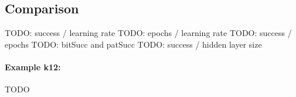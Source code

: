 

\subsection{Comparison} 

TODO: success / learning rate 
TODO: epochs / learning rate 
TODO: success / epochs 
TODO: bitSucc and patSucc
TODO: success / hidden layer size 
 

\paragraph{Example k12:}
TODO 

